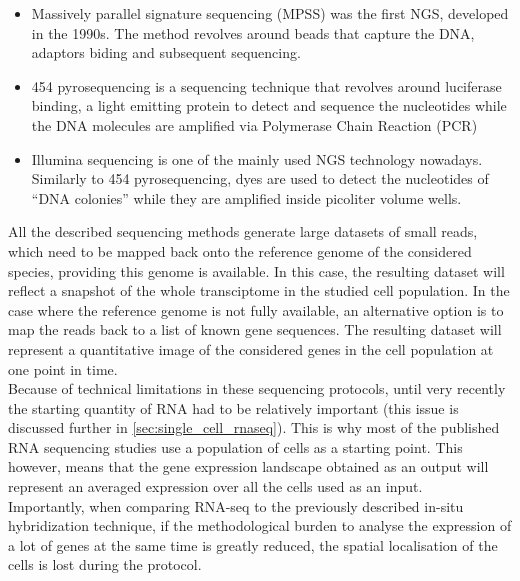 \begin{itemize}
	\item Massively parallel signature sequencing (MPSS) \cite{brenner00} was the first NGS, developed in the 1990s. The method revolves around beads that capture the DNA, adaptors biding and subsequent sequencing.
	
	\item 454 pyrosequencing \cite{margulies05} is a sequencing technique that revolves around luciferase binding, a light emitting protein to detect and sequence the nucleotides while the DNA molecules are amplified via Polymerase Chain Reaction (PCR)
	
	\item Illumina sequencing \cite{bentley08} is one of the mainly used NGS technology nowadays. Similarly to 454 pyrosequencing, dyes are used to detect the nucleotides of ``DNA colonies'' while they are amplified inside picoliter volume wells.
    
\end{itemize}     
    
    All the described sequencing methods generate large datasets of small reads, which need to be mapped back onto the reference genome of the considered species, providing this genome is available. In this case, the resulting dataset will reflect a snapshot of the whole transciptome in the studied cell population. In the case where the reference genome is not fully available, an alternative option is to map the reads back to a list of known gene sequences. The resulting dataset will represent a quantitative image of the considered genes in the cell population at one point in time.\\
    
    Because of technical limitations in these sequencing protocols, until very recently the starting quantity of RNA had to be relatively important (this issue is discussed further in \ref{sec:single_cell_rnaseq}). This is why most of the published RNA sequencing studies use a population of cells as a starting point. This however, means that the gene expression landscape obtained as an output will represent an averaged expression over all the cells used as an input.\\
    
    Importantly, when comparing RNA-seq to the previously described in-situ hybridization technique, if the methodological burden to analyse the expression of a lot of genes at the same time is greatly reduced, the spatial localisation of the cells is lost during the protocol.\\
    
